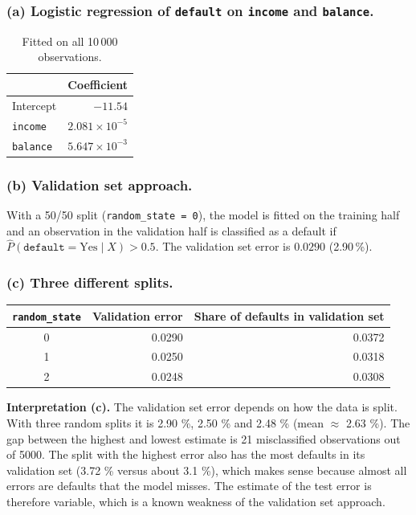 \documentclass[11pt]{article}
\begin{document}
\subsubsection*{(a) Logistic regression of \texttt{default} on \texttt{income} and \texttt{balance}.}

\begin{table}[H]
  \centering
  \begin{tabular}{lr}
    \toprule
    & Coefficient \\
    \midrule
    Intercept & $-11.54$ \\
    \texttt{income} & $2.081 \times 10^{-5}$ \\
    \texttt{balance} & $5.647 \times 10^{-3}$ \\
    \bottomrule
  \end{tabular}
  \caption{Fitted on all 10\,000 observations.}
\end{table}

\subsubsection*{(b) Validation set approach.}
With a 50/50 split (\texttt{random\_state = 0}), the model is fitted on the training half and an observation in the validation half is classified as a default if $\hat P(\texttt{default} = \text{Yes} \mid X) > 0.5$. The validation set error is $0.0290$ (2.90\,\%).

\subsubsection*{(c) Three different splits.}

\begin{table}[H]
  \centering
  \begin{tabular}{crr}
    \toprule
    \texttt{random\_state} & Validation error & Share of defaults in validation set \\
    \midrule
    0 & 0.0290 & 0.0372 \\
    1 & 0.0250 & 0.0318 \\
    2 & 0.0248 & 0.0308 \\
    \bottomrule
  \end{tabular}
\end{table}

\textbf{Interpretation (c).} The validation set error depends on how the data is split. With three random splits it is 2.90 \%, 2.50 \% and 2.48 \% (mean $\approx$ 2.63 \%). The gap between the highest and lowest estimate is 21 misclassified observations out of 5000. The split with the highest error also has the most defaults in its validation set (3.72 \% versus about 3.1 \%), which makes sense because almost all errors are defaults that the model misses. The estimate of the test error is therefore variable, which is a known weakness of the validation set approach.
\end{document}
